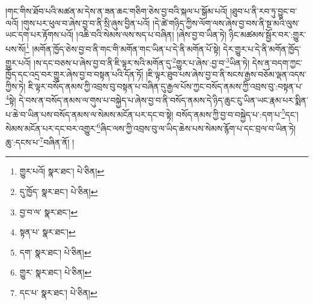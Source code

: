 །གང་གིས་ཐོབ་པའི་མཚན་མ་དེས་ན་ཟན་ཆང་གཅིག་ཅེས་བྱ་བའི་སྐལ་པ་སྒོམ་པའོ། །ཐུབ་པ་ནི་རབ་ཏུ་བྱུང་བ་ལའོ། །གུས་པར་ཕུལ་བ་ཞེས་བྱ་བ་ནི་སྲི་ཞུས་བྱིན་པའོ། །དེ་ཚེ་གཉིད་ཀྱིས་ལོག་ལས་ཞེས་བྱ་བས་ནི་སྔ་མའི་ལུས་ཡང་དག་པར་རྟོགས་པའོ། །འཆི་བའི་སེམས་ལས་སད་པ་བཞིན། །ཞེས་བྱ་བ་ཡིན་ཏེ། ཉིང་མཚམས་སྦྱོར་བར་:གྱུར་པས་སོ།\footnote{གྱུར་པའོ།  སྣར་ཐང་།  པེ་ཅིན། } །མགོན་ཁྱོད་ཅེས་བྱ་བ་ནི་གང་གི་མགོན་གང་ཡིན་པ་དེ་ནི་མགོན་པོ་སྟེ། དེར་གྱུར་པ་དེ་ནི་མགོན་ཁྱོད་གྱུར་པའོ། །ས་དང་བཅས་པ་ཞེས་བྱ་བ་ནི་ཇི་ལྟར་སའི་མགོན་དུ་\footnote{དུ་ཁྱོད་  སྣར་ཐང་།  པེ་ཅིན། }གྱུར་པ་ཞེས་:བྱ་བ་\footnote{བྱ་བ་ལ་  སྣར་ཐང་། }ཡིན་ཏེ། དེས་ན་བདག་ཀྱང་ཁྱོད་དང་འདྲ་བར་གྱུར་ཞེས་བྱ་བ་བསྟན་པའི་དོན་ཏོ། །ཇི་ལྟར་ཐུབ་པས་ཞེས་བྱ་བ་ནི་སངས་རྒྱས་བཅོམ་ལྡན་འདས་ཀྱིས་ཏེ། ཇི་ལྟར་བསོད་ནམས་ཀྱི་འབྲས་བུ་བསྟན་པ་བཞིན་དུ་རྒྱལ་པོས་ཀྱང་བསོད་ནམས་ཀྱི་འབྲས་བུ་:བསྟན་པ་\footnote{སྟན་པ་  སྣར་ཐང་། }སྟེ། དེ་བས་ན་བསོད་ནམས་ལ་གུས་པ་བསྐྱེད་པ་ཞེས་བྱ་བ་ནི་བསོད་ནམས་དེ་ཉིད་ཆུང་ངུ་ཡིན་ཡང་རྣམ་པར་སྨིན་པ་ཆེ་བ་ཡིན་པས་བསོད་ནམས་ལ་སེམས་མངོན་པར་དང་བ་སྟེ། བསོད་ནམས་ཀྱི་བྱ་བ་བསྐྱེད་པ་:དག་པ་\footnote{དག་  སྣར་ཐང་།  པེ་ཅིན། }དང་། སེམས་མངོན་པར་དང་བར་འགྱུར་\footnote{གྱུར་  སྣར་ཐང་།  པེ་ཅིན། }ཞིང་ལས་ཀྱི་འབྲས་བུ་ལ་ཡིད་ཆེས་པས་སེམས་རྙོག་པ་དང་བྲལ་བ་ཡིན་ཏེ། ཆུ་:དངས་པ་\footnote{དང་པ་  སྣར་ཐང་།  པེ་ཅིན། }བཞིན་ནོ། །
